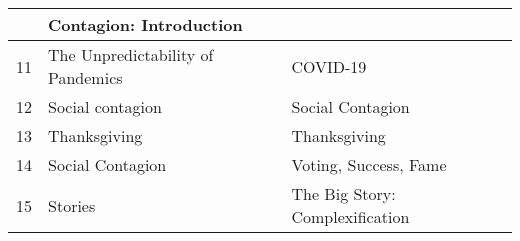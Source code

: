 {\begin{tabular}{|p{}|p{}|p{}|}
    &
    Contagion: Introduction 
    \\
    \hline
    11 %
    &
    The Unpredictability of Pandemics
    &
    COVID-19
    \\
    \hline
    12 %
    &
    Social contagion
    &
    Social Contagion 
    \\
    \hline                                                                        
    13 %
    &
    Thanksgiving 
    &
    Thanksgiving 
    \\
    \hline
    14 %
    &
    Social Contagion 
    &
    Voting, Success, Fame
    \\
    \hline
    15 %
    &
    Stories 
    &
    The Big Story: Complexification
    \\
    \hline
  \end{tabular}\\
  \smallskip

}

\newcommand{\importantdates}{
  \begin{enumerate}
  \item
    Classes run from Monday, August 29 to Friday, December 9.
  \item
    Add/Drop, Audit, Pass/No Pass deadline---Monday, September 12.
  \item
    Last day to withdraw---Monday, October 31 (Sadness!).
  \item
    Reading and Exam period---Saturday, December 10 to Friday, December 16.
  \end{enumerate}
}

\newcommand{\importantdatesvolumeone}{\importantdates}

\newcommand{\importantdatesvolumetwo}{
  \begin{enumerate}
  \item
    Classes run from Monday, January 17 to Friday, May 5.
  \item
    Add/Drop, Audit, Pass/No Pass deadline---Monday, January 30.
  \item
    No class on Tuesday, March 7 (Town Meeting Day Recess).
  \item
    Spring recess, March 13 to 17.
  \item
    Last day to \sout{escape} withdraw---Monday, April 3.
  \item
    Reading and Exam period---Saturday, May 6 to Friday, May 12.
  \end{enumerate}
}



